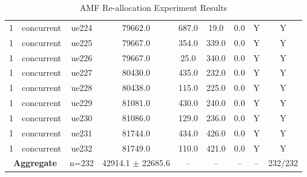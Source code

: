 \begin{table}[ht]
\begin{tabular}{|c|c|c|c|c|c|c|c|c|}
1 & concurrent & ue224 & 79662.0 & 687.0 & 19.0 & 0.0 & Y & Y \\
1 & concurrent & ue225 & 79667.0 & 354.0 & 339.0 & 0.0 & Y & Y \\
1 & concurrent & ue226 & 79667.0 & 25.0 & 340.0 & 0.0 & Y & Y \\
1 & concurrent & ue227 & 80430.0 & 435.0 & 232.0 & 0.0 & Y & Y \\
1 & concurrent & ue228 & 80438.0 & 115.0 & 225.0 & 0.0 & Y & Y \\
1 & concurrent & ue229 & 81081.0 & 430.0 & 240.0 & 0.0 & Y & Y \\
1 & concurrent & ue230 & 81086.0 & 129.0 & 236.0 & 0.0 & Y & Y \\
1 & concurrent & ue231 & 81744.0 & 434.0 & 426.0 & 0.0 & Y & Y \\
1 & concurrent & ue232 & 81749.0 & 110.0 & 421.0 & 0.0 & Y & Y \\
\multicolumn{2}{|c|}{\textbf{Aggregate}} & n=232 & 42914.1 $\pm$ 22685.6 & -- & -- & -- & -- & 232/232 \\
\hline
\end{tabular}
\caption{AMF Re-allocation Experiment Results}
\label{tab:amf_realloc}
\end{table}
